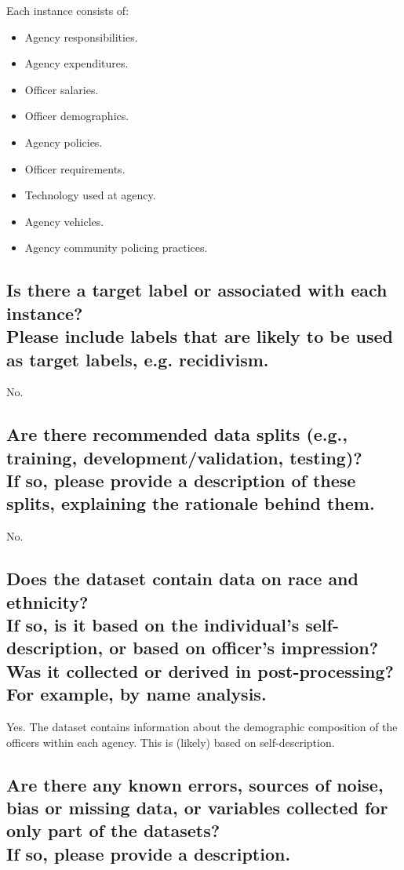 \documentclass[letterpaper, 10 pt, conference]{ieeeconf}  %
\newcommand{\subtitle}[1]{{\\ \small \normalfont \color{purple} #1}}
\begin{document}
Each instance consists of:

\begin{itemize}
    \item Agency responsibilities.
    \item Agency expenditures.
    \item Officer salaries.
    \item Officer demographics.
    \item Agency policies.
    \item Officer requirements.
    \item Technology used at agency.
    \item Agency vehicles.
    \item Agency community policing practices.
\end{itemize}


\subsection{Is there a target label or associated with each instance? \subtitle{Please include labels that are likely to be used as target labels, e.g. recidivism.}}

No. 

\subsection{Are there recommended data splits (e.g., training, development/validation, testing)? \subtitle{If so, please provide a description of these splits, explaining the rationale behind them.}}

No.

\subsection{Does the dataset contain data on race and ethnicity? \subtitle{If so, is it based on the individual's self-description, or based on officer's impression? Was it collected or derived in post-processing? For example, by name analysis.}}

Yes. The dataset contains information about the demographic composition of the officers within each agency. This is (likely) based on self-description.

\subsection{Are there any known errors, sources of noise, bias or missing data, or variables collected for only part of the datasets? \subtitle{If so, please provide a description.}}
\end{document}
